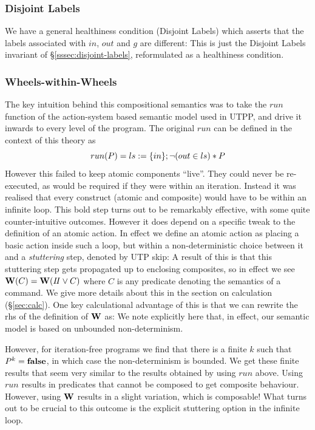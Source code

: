 \subsubsection{Disjoint Labels}

We have a general healthiness condition (Disjoint Labels) which asserts
that the labels associated with $in$, $out$ and $g$
are different:
This is just the Disjoint Labels invariant of \S\ref{sssec:disjoint-labels},
reformulated as a healthiness condition.

\subsubsection{Wheels-within-Wheels}

The key intuition behind this compositional semantics was to take the
$run$ function of the action-system based semantic model used in UTPP,
and drive it inwards to every level of the program.
The original $run$ can be defined in the context of this theory as
\[
  run(P) = ls := \{in\} ; \lnot (out \in ls) * P
\]
However this failed to keep atomic components ``live''.
They could never be re-executed,
as would be required if they were within an iteration.
Instead it was realised that every construct (atomic and composite)
would have to be within an infinite loop.
This bold step turns out to be remarkably effective,
with some quite counter-intuitive outcomes.
However it does depend on a specific tweak to the
definition of an atomic action.
In effect we define an atomic action
as placing a basic action inside such a loop,
but within a non-deterministic choice between it
and a \emph{stuttering} step, denoted by UTP skip:
A result of this is that this stuttering step gets
propagated up to enclosing composites,
so in effect we see $\mathbf{W}(C)=\mathbf{W}(I\!I\lor C)$
where $C$ is any predicate denoting the semantics of a command.
We give more details about this in the section on calculation (\S\ref{sec:calc}).
One key calculational advantage of this is that we can rewrite
the rhs of the definition of $\mathbf{W}$ as:
%
We note explicitly here that, in effect,
our semantic model is based on unbounded non-determinism.

However, for iteration-free programs
we find that there is a finite $k$ such that $P^k = \mathbf{false}$,
in which case the non-determinism is bounded.
We get these finite results that seem very similar
to the results obtained by using $run$ above.
Using $run$ results in predicates that cannot be composed
to get composite behaviour.
However, using $\mathbf{W}$ results in a slight variation,
which is composable!
What turns out to be crucial
to this outcome is the explicit stuttering option in the infinite loop.


